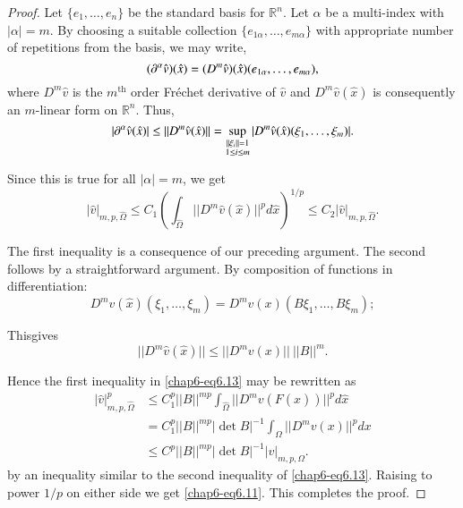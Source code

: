 \begin{proof}
Let $\{e_{1},\ldots,e_{n}\}$ be the standard basis for
$\mathbb{R}^{n}$. Let $\alpha$ be a multi-index with $|\alpha|=m$. By
choosing a suitable collection $\{e_{1\alpha},\ldots,e_{m\alpha}\}$
with appropriate number of repetitions from the basis, we may write,
$$
(\partial^{\alpha}\hat{v})(\hat{x})=(D^{m}\hat{v})(\hat{x})(e_{1\alpha},\ldots,e_{m\alpha}), 
$$
where $D^{m}\hat{v}$ is the $m^{\text{th}}$ order Fr\'echet derivative
of $\hat{v}$ and $D^{m}\hat{v}(\hat{x})$ is consequently an $m$-linear
form on $\mathbb{R}^{n}$. Thus,
$$
|\partial^{\alpha}\hat{v}(\hat{x})|\leq
||D^{m}\hat{v}(\hat{x})||=\sup\limits_{\substack{||\xi_{i}||=1\\ 1\leq
    i\leq m}}|D^{m}\hat{v}(\hat{x})(\xi_{1},\ldots,\xi_{m})|. 
$$

Since this is true for all $|\alpha|=m$, we get
\begin{equation*}
|\hat{v}|_{m,p,\hat{\Omega}}\leq
C_{1}\left(\int_{\hat{\Omega}}||D^{m}\hat{v}(\hat{x})||^{p}d\hat{x}\right)^{1/p}\leq
C_{2}|\hat{v}|_{m,p,\hat{\Omega}}.\tag{6.13}\label{chap6-eq6.13}
\end{equation*}

The first inequality is a consequence of our preceding argument. The
second follows by a straightforward argument. By composition of
functions in differentiation:
\begin{equation*}
D^{m}\hat{v}(\hat{x})(\xi_{1},\ldots,\xi_{m})=D^{m}v(x)(B\xi_{1},\ldots,B\xi_{m}); \tag{6.14}\label{chap6-eq6.14}
\end{equation*}

This\pageoriginale gives
\begin{equation*}
||D^{m}\hat{v}(\hat{x})||\leq
||D^{m}v(x)||~||B||^{m}.\tag{6.15}\label{chap6-eq6.15} 
\end{equation*}

Hence the first inequality in \eqref{chap6-eq6.13} may be rewritten as
\begin{align*}
|\hat{v}|^{p}_{m,p,\hat{\Omega}} &\leq
C^{p}_{1}||B||^{mp}\int_{\hat{\Omega}}||D^{m}v(F(\hat{x}))||^{p}d\hat{x}\\ 
&= C^{p}_{1}||B||^{mp}|\det B|^{-1}\int_{\Omega}||D^{m}v(x)||^{p}dx\\
&\leq C^{p}||B||^{mp}|\det B|^{-1}|v|_{m,p,\Omega}.
\end{align*}
by an inequality similar to the second inequality of
\eqref{chap6-eq6.13}. Raising to power $1/p$ on either side we get
\eqref{chap6-eq6.11}. This completes the proof.
\end{proof}

